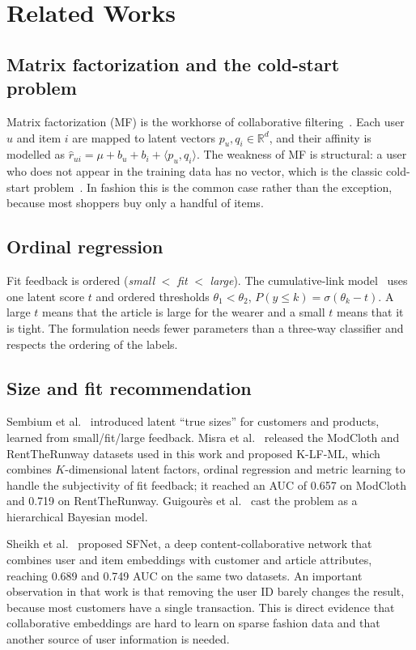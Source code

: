 \section{Related Works}\label{sec2}

\subsection{Matrix factorization and the cold-start problem}
Matrix factorization (MF) is the workhorse of collaborative filtering~\cite{koren2009mf}. Each user $u$ and item $i$ are mapped to latent vectors $p_u, q_i \in \mathbb{R}^d$, and their affinity is modelled as $\hat r_{ui} = \mu + b_u + b_i + \langle p_u, q_i\rangle$. The weakness of MF is structural: a user who does not appear in the training data has no vector, which is the classic cold-start problem~\cite{schein2002coldstart}. In fashion this is the common case rather than the exception, because most shoppers buy only a handful of items.

\subsection{Ordinal regression}
Fit feedback is ordered (\emph{small} $<$ \emph{fit} $<$ \emph{large}). The cumulative-link model~\cite{mccullagh1980ordinal} uses one latent score $t$ and ordered thresholds $\theta_1 < \theta_2$, $P(y \le k) = \sigma(\theta_k - t)$. A large $t$ means that the article is large for the wearer and a small $t$ means that it is tight. The formulation needs fewer parameters than a three-way classifier and respects the ordering of the labels.

\subsection{Size and fit recommendation}
Sembium et al.~\cite{sembium2017size} introduced latent ``true sizes'' for customers and products, learned from small/fit/large feedback. Misra et al.~\cite{misra2018fit} released the ModCloth and RentTheRunway datasets used in this work and proposed K-LF-ML, which combines $K$-dimensional latent factors, ordinal regression and metric learning to handle the subjectivity of fit feedback; it reached an AUC of 0.657 on ModCloth and 0.719 on RentTheRunway. Guigourès et al.~\cite{guigoures2018bayes} cast the problem as a hierarchical Bayesian model.

Sheikh et al.~\cite{sheikh2019sfnet} proposed SFNet, a deep content-collaborative network that combines user and item embeddings with customer and article attributes, reaching 0.689 and 0.749 AUC on the same two datasets. An important observation in that work is that removing the user ID barely changes the result, because most customers have a single transaction. This is direct evidence that collaborative embeddings are hard to learn on sparse fashion data and that another source of user information is needed.

